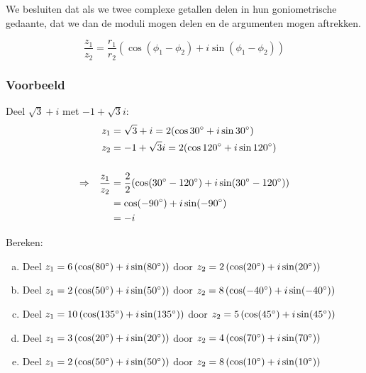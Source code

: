 \documentclass[12pt,twoside,a4]{article}
\begin{document}
We besluiten dat als we twee complexe getallen delen in hun goniometrische gedaante, dat we dan de moduli mogen delen en de argumenten mogen aftrekken.\\

\begin{mdframed}
  \[
    \dfrac{z_1}{z_2} = \dfrac{r_1}{r_2} \left(\cos (\phi_1 - \phi_2) + i \sin (\phi_1 - \phi_2)\right)
  \]
\end{mdframed}

\subsubsection*{Voorbeeld}

Deel $\sqrt{3} + i$ met $-1+\sqrt{3}i$:
  \begin{align*}
      &&       z_1 &= \sqrt{3} + i = 2(\cos 30^\circ + i\sin 30^\circ)\\
      &&       z_2 &= -1 + \sqrt{3}i = 2(\cos 120^\circ + i\sin 120^\circ)\\\\
    \Rightarrow && \dfrac{z_1}{z_2} &= \dfrac{2}{2} ( \cos( 30^\circ - 120^\circ ) + i\sin( 30^\circ - 120^\circ ) )\\
      &&           &= \cos(-90^\circ) + i\sin(-90^\circ)\\
      &&           &= -i
  \end{align*}

\begin{oefening}
Bereken:
\begin{enumerate}[(a)]
  \itemsep.5em
  \item Deel $z_1=6\left(\cos(80^\circ)+i\sin(80^\circ)\right)$ door $z_2=2\left(\cos(20^\circ)+i\sin(20^\circ)\right)$
  \item Deel $z_1=2\left(\cos(50^\circ)+i\sin(50^\circ)\right)$ door $z_2=8\left(\cos(-40^\circ)+i\sin(-40^\circ)\right)$
  \item Deel $z_1=10\left(\cos(135^\circ)+i\sin(135^\circ)\right)$ door $z_2=5\left(\cos(45^\circ)+i\sin(45^\circ)\right)$
  \item Deel $z_1=3\left(\cos(20^\circ)+i\sin(20^\circ)\right)$ door $z_2=4\left(\cos(70^\circ)+i\sin(70^\circ)\right)$
  \item Deel $z_1=2\left(\cos(50^\circ)+i\sin(50^\circ)\right)$ door $z_2=8\left(\cos(10^\circ)+i\sin(10^\circ)\right)$
\end{enumerate}
\end{oefening}
\end{document}
